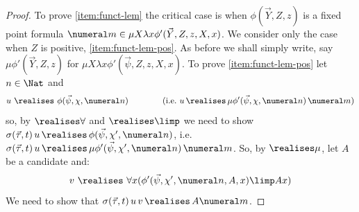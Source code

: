 \begin{proof}
    To prove \eqref{item:funct-lem} the critical case is when $\phi(\vec Y,Z,z) $ is a fixed point formula $ \numeral m \in \mu X \lambda x \phi'(\vec Y,\allowbreak Z,z,X,x)$.
    We consider only the case when $Z$ is positive, \eqref{item:funct-lem-pos}.
    As before we shall simply write, say $\mu\phi'(\vec Y,Z,z)$ for $\mu X\lambda x \phi'(\vec \psi, Z,z,X,x)$.
    To prove \eqref{item:funct-lem-pos} let $n \in \Nat$ and
    \begin{equation}
    \label{eq:funct-lem-mu-antecedent}
        u\ \realises\ \phi(\vec \psi,\chi,\numeral n)
        \qquad\qquad
        \text{(i.e.\ $u\, \realises\, \mu\phi'(\vec \psi,\chi,\numeral n)\, \numeral m$)}
    \end{equation}
    so, by $\realises\forall$ and $\realises\limp$ we need to show $\sigma(\vec \tau,t)\, u\,  \realises\, \phi(\vec \psi,\chi',\numeral n)$, i.e.\ $ \sigma(\vec \tau,t)\, u\,  \realises\,  \mu\phi'(\vec \psi,\chi',\numeral n)\, \numeral m$.
    So, by $\realises\mu$, let $A$ be a candidate and:
    \begin{equation}
    \label{eq:funct-lem-mu-succedent-input}
        v\ \realises\ \forall x (\phi'(\vec \psi,\chi',\numeral n, A,x) \limp Ax)
    \end{equation}
    We need to show that $\sigma(\vec \tau,t)\, u\, v\, \realises\, A\numeral m$.



\end{proof}
